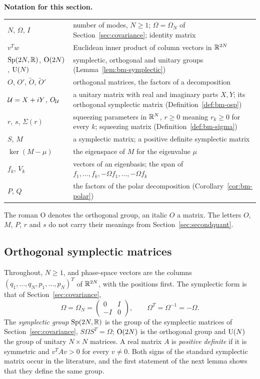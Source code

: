 \begin{vetdenv}
\medskip
\noindent\textbf{Notation for this section.}
\begin{center}
\begin{tabular}{@{}L{0.3\textwidth}L{0.64\textwidth}@{}}
$N$, $\Omega$, $I$ & number of modes, $N\ge1$; $\Omega=\Omega_N$ of Section~\ref{sec:covariance}; identity matrix\\
$v^Tw$ & Euclidean inner product of column vectors in $\mathbb R^{2N}$\\
$\mathrm{Sp}(2N,\mathbb R)$, $\mathrm{O}(2N)$, $\mathrm{U}(N)$ & symplectic, orthogonal and unitary groups (Lemma~\ref{lem:bm-symplectic})\\
$O$, $O'$, $\tilde O$, $\tilde O'$ & orthogonal matrices, the factors of a decomposition\\
$\mathcal U=X+iY$, $O_\mathcal U$ & a unitary matrix with real and imaginary parts $X,Y$; its orthogonal symplectic matrix
(Definition~\ref{def:bm-osp})\\
$r$, $s$, $\Sigma(r)$ & squeezing parameters in $\mathbb R^N$, $r\ge0$ meaning $r_k\ge0$ for every $k$; squeezing matrix
(Definition~\ref{def:bm-sigma})\\
$S$, $M$ & a symplectic matrix; a positive definite symplectic matrix\\
$\ker(M-\mu)$ & the eigenspace of $M$ for the eigenvalue $\mu$\\
$f_k$, $V_k$ & vectors of an eigenbasis; the span of $f_1,\ldots,f_k,-\Omega f_1,\ldots,-\Omega f_k$\\
$P$, $Q$ & the factors of the polar decomposition (Corollary~\ref{cor:bm-polar})\\
\end{tabular}
\end{center}
The roman $\mathrm O$ denotes the orthogonal group, an italic $O$ a matrix. The letters $O$, $M$, $P$, $r$ and $s$
do not carry their meanings from Section~\ref{sec:secondquant}.

\subsection{Orthogonal symplectic matrices}

Throughout, $N\ge1$, and phase-space vectors are the columns $(q_1,\ldots,q_N,p_1,\ldots,p_N)^T$ of $\mathbb R^{2N}$, with the
positions first. The symplectic form is that of Section~\ref{sec:covariance},
\[
 \Omega=\Omega_N=\begin{pmatrix}0&I\\-I&0\end{pmatrix},\qquad\Omega^T=\Omega^{-1}=-\Omega .
\]
The \emph{symplectic group} $\mathrm{Sp}(2N,\mathbb R)$ is the group of the symplectic matrices of
Section~\ref{sec:covariance}, $S\Omega S^T=\Omega$; $\mathrm{O}(2N)$ is the orthogonal group and $\mathrm{U}(N)$ the group of unitary
$N\times N$ matrices. A real matrix $A$ is \emph{positive definite} if it is symmetric and $v^TAv>0$ for every $v\ne0$.
Both signs of the standard symplectic matrix occur in the literature, and the first statement of the next lemma
shows that they define the same group.


\end{vetdenv}
